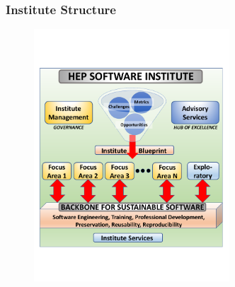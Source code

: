 \begin{frame}
\frametitle{Institute Structure}

\begin{figure}[ht]
\begin{center}
\includegraphics[width=0.65\textwidth]{images/S2I2-HEP_elements_general.pdf}
\label{fig:s2i2_elements}
\end{center}
\end{figure}


\end{frame}


